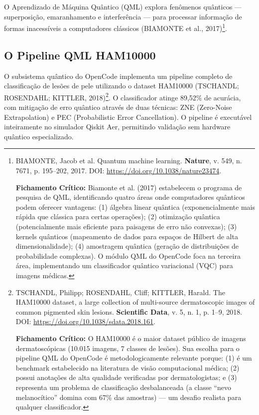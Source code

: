 O Aprendizado de Máquina Quântico (QML) explora fenômenos quânticos --- superposição, emaranhamento e interferência --- para processar informação de formas inacessíveis a computadores clássicos (BIAMONTE et al., 2017)\footnote{
  BIAMONTE, Jacob et al. Quantum machine learning. \textbf{Nature}, v. 549, n. 7671, p. 195--202, 2017. DOI: \url{https://doi.org/10.1038/nature23474}.

  \textbf{Fichamento Crítico:} Biamonte et al. (2017) estabelecem o programa de pesquisa de QML, identificando quatro áreas onde computadores quânticos podem oferecer vantagens: (1) álgebra linear quântica (exponencialmente mais rápida que clássica para certas operações); (2) otimização quântica (potencialmente mais eficiente para paisagens de erro não convexas); (3) kernels quânticos (mapeamento de dados para espaços de Hilbert de alta dimensionalidade); (4) amostragem quântica (geração de distribuições de probabilidade complexas). O módulo QML do OpenCode foca na terceira área, implementando um classificador quântico variacional (VQC) para imagens médicas.
}.

\subsection{O Pipeline QML HAM10000}

O subsistema quântico do OpenCode implementa um pipeline completo de classificação de lesões de pele utilizando o dataset HAM10000 (TSCHANDL; ROSENDAHL; KITTLER, 2018)\footnote{
  TSCHANDL, Philipp; ROSENDAHL, Cliff; KITTLER, Harald. The HAM10000 dataset, a large collection of multi-source dermatoscopic images of common pigmented skin lesions. \textbf{Scientific Data}, v. 5, n. 1, p. 1--9, 2018. DOI: \url{https://doi.org/10.1038/sdata.2018.161}.

  \textbf{Fichamento Crítico:} O HAM10000 é o maior dataset público de imagens dermatoscópicas (10.015 imagens, 7 classes de lesões). Sua escolha para o pipeline QML do OpenCode é metodologicamente relevante porque: (1) é um benchmark estabelecido na literatura de visão computacional médica; (2) possui anotações de alta qualidade verificadas por dermatologistas; e (3) representa um problema de classificação desbalanceada (a classe ``nevo melanocítico'' domina com 67\% das amostras) --- um desafio realista para qualquer classificador.
}. O classificador atinge 89,52\% de acurácia, com mitigação de erro quântico através de duas técnicas: ZNE (Zero-Noise Extrapolation) e PEC (Probabilistic Error Cancellation). O pipeline é executável inteiramente no simulador Qiskit Aer, permitindo validação sem hardware quântico especializado.

